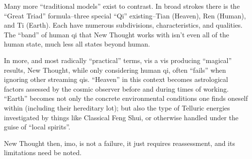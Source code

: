 \begin{footnotesize}
\begin{sffamily}
Many more “traditional models” exist to contrast. In broad strokes there is the “Great Triad” formula–three special “Qi” existing–Tian (Heaven), Ren (Human), and Ti (Earth). Each have numerous subdivisions, characteristics, and qualities. The “band” of human qi that New Thought works with isn't even all of the human state, much less all states beyond human.

In more, and most radically “practical” terms, vis a vis producing “magical” results, New Thought, while only considering human qi, often “fails” when ignoring other streaming qis. “Heaven” in this context becomes astrological factors assessed by the cosmic observer before and during times of working. “Earth” becomes not only the concrete environmental conditions one finds oneself within (including their hereditary lot); but also the type of Telluric energies investigated by things like Classical Feng Shui, or otherwise handled under the guise of “local spirits”.

New Thought then, imo, is not a failure, it just requires reassessment, and its limitations need be noted.


\end{sffamily}\end{footnotesize}
